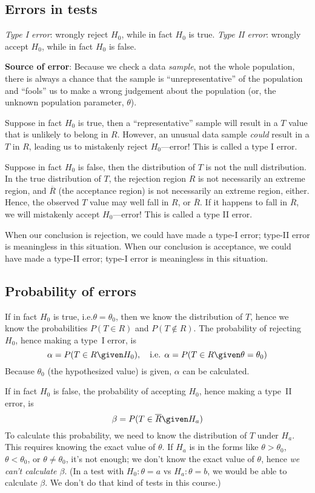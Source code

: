 \documentclass[12pt]{article}
\begin{document}
\subsection{Errors in tests}

%
\emph{Type I error}:
wrongly reject $H_0$, while in fact $H_0$ is true.
\emph{Type II error}:
wrongly accept $H_0$, while in fact $H_0$ is false.

\textbf{Source of error}:
Because we check a data \emph{sample}, not the whole population,
there is always a chance that the sample is ``unrepresentative'' of the
population and ``fools'' us to make a wrong judgement about the population
(or, the unknown population parameter, $\theta$).

Suppose in fact $H_0$ is true, then a ``representative'' sample
will result in a $T$ value that is unlikely to belong in $R$.
However, an unusual data sample \emph{could} result in a $T$ in $R$,
leading us to mistakenly reject $H_0$---error!
This is called a type I error.

Suppose in fact $H_0$ is false, then the distribution of $T$
is not the null distribution.
In the true distribution of $T$,
the rejection region $R$ is not necessarily an extreme region,
and $\overline{R}$ (the acceptance region) is not necessarily an extreme
region, either.
Hence, the observed $T$ value may well fall in $R$, or $\overline{R}$.
If it happens to fall in $\overline{R}$,
we will mistakenly accept $H_0$---error!
This is called a type II error.

\alert
When our conclusion is rejection, we could have made a type-I error;
type-II error is meaningless in this situation.
When our conclusion is acceptance, we could have made a type-II error;
type-I error is meaningless in this situation.

\subsection{Probability of errors}

If in fact $H_0$ is true, i.e.\@ $\theta = \theta_0$,
then we know the distribution of $T$,
hence we know the probabilities
$P(T \in R)$ and $P(T \notin R)$.
The probability of rejecting $H_0$,
hence making a type~I error, is
\[
\alpha = P(T \in R \given H_0)
,\quad\text{i.e. }
\alpha = P(T \in R \given \theta = \theta_0)
\]
Because $\theta_0$ (the hypothesized value) is given,
$\alpha$ can be calculated.

If in fact $H_0$ is false,
the probability of accepting $H_0$,
hence making a type~II error, is
\[
\beta = P(T \in \overline{R} \given H_a)
\]
To calculate this probability,
we need to know the distribution of $T$ under $H_a$.
This requires knowing the exact value of $\theta$.
If $H_a$ is in the forms like
$\theta > \theta_0$, $\theta < \theta_0$, or $\theta \ne \theta_0$,
it's not enough;
we don't know the exact value of $\theta$,
hence \emph{we can't calculate $\beta$}.
(In a test with $H_0: \theta = a$ vs $H_a: \theta = b$,
we would be able to calculate $\beta$. We don't do that kind of tests in
this course.)
\end{document}
